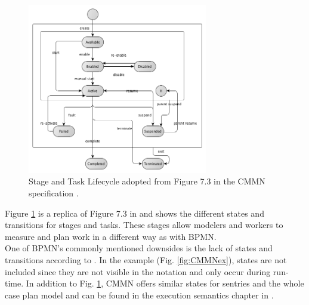 \begin{figure}
  \centering
\includegraphics[width=0.7\textwidth]{../figures/chapter_indicators/CMMN_Stage_and_Task_Lifecycle_CMMN.png} 
\caption{Stage and Task Lifecycle adopted from Figure 7.3 in the CMMN specification \cite{CMMNspec2014}.}
  \label{fig:CMMNstates}
\end{figure}

Figure \ref{fig:CMMNstates} is a replica of Figure 7.3 in \cite{CMMNspec2014} and shows the different states and transitions for stages and tasks. These stages allow modelers and workers to measure and plan work in a different way as with BPMN. \\
One of BPMN's commonly mentioned downsides is the lack of states and transitions according to \cite{Recker2010}. In the example (Fig. \ref{fig:CMMNex}), states are not included since they are not visible in the notation and only occur during run-time. In addition to Fig. \ref{fig:CMMNstates}, CMMN offers similar states for sentries and the whole case plan model and can be found in the execution semantics chapter in \cite{CMMNspec2014}. \newpage

